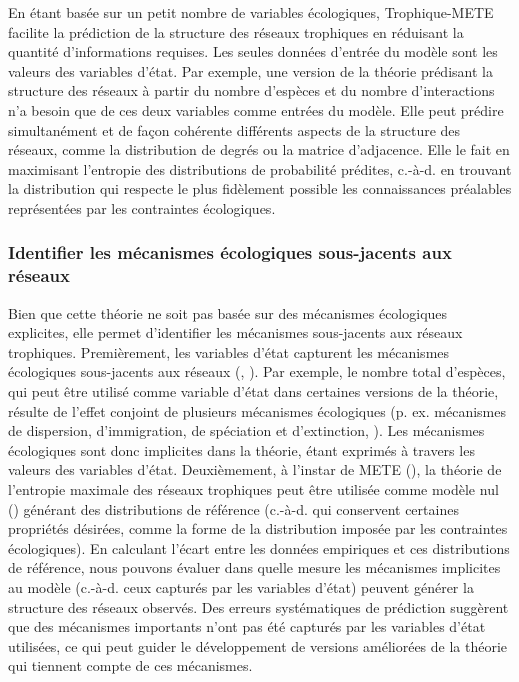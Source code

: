 En étant basée sur un petit nombre de variables écologiques, Trophique-METE
facilite la prédiction de la structure des réseaux trophiques en réduisant la
quantité d'informations requises. Les seules données d'entrée du modèle sont les
valeurs des variables d'état. Par exemple, une version de la théorie prédisant
la structure des réseaux à partir du nombre d'espèces et du nombre
d'interactions n'a besoin que de ces deux variables comme entrées du modèle.
Elle peut prédire simultanément et de façon cohérente différents aspects de la
structure des réseaux, comme la distribution de degrés ou la matrice
d'adjacence. Elle le fait en maximisant l'entropie des distributions de
probabilité prédites, c.-à-d. en trouvant la distribution qui respecte le
plus fidèlement possible les connaissances préalables représentées par les
contraintes écologiques. 

\subsubsection{Identifier les mécanismes écologiques sous-jacents aux réseaux} 

Bien que cette théorie ne soit pas basée sur des mécanismes écologiques
explicites, elle permet d'identifier les mécanismes sous-jacents aux réseaux
trophiques. Premièrement, les variables d'état capturent les mécanismes
écologiques sous-jacents aux réseaux (\cite{White2012Characterizing},
\cite{McGill2010Mechanisms}). Par exemple, le nombre total d'espèces, qui peut
être utilisé comme variable d'état dans certaines versions de la théorie,
résulte de l'effet conjoint de plusieurs mécanismes écologiques (p. ex.
mécanismes de dispersion, d'immigration, de spéciation et d'extinction,
\cite{Whittaker2001Scale}). Les mécanismes écologiques sont donc implicites dans
la théorie, étant exprimés à travers les valeurs des variables d'état.
Deuxièmement, à l'instar de METE (\cite{Harte2014Maximum}), la théorie de
l'entropie maximale des réseaux trophiques peut être utilisée comme modèle nul
(\cite{Fortuna2006Habitat}) générant des distributions de référence (c.-à-d. qui
conservent certaines propriétés désirées, comme la forme de la distribution
imposée par les contraintes écologiques). En calculant l'écart entre les données
empiriques et ces distributions de référence, nous pouvons évaluer dans quelle
mesure les mécanismes implicites au modèle (c.-à-d. ceux capturés par les
variables d'état) peuvent générer la structure des réseaux observés. Des erreurs
systématiques de prédiction suggèrent que des mécanismes importants n'ont pas
été capturés par les variables d'état utilisées, ce qui peut guider le
développement de versions améliorées de la théorie qui tiennent compte de ces
mécanismes. 

